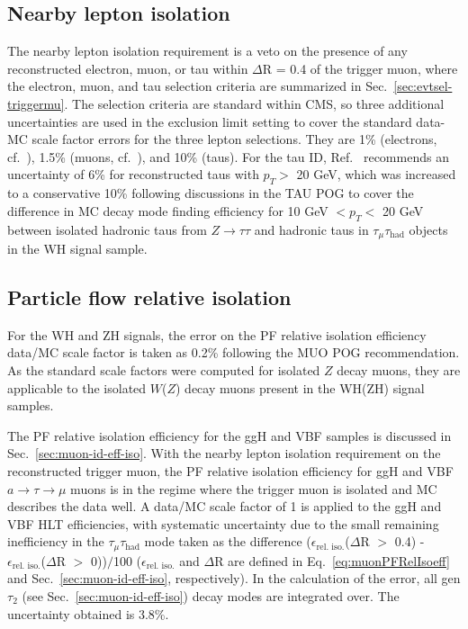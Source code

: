 \subsection{Nearby lepton isolation\label{lepideff-leptonveto}}

The nearby lepton isolation requirement is a veto on the presence of any reconstructed electron, muon, or tau within $\Delta$R = 0.4 of the trigger muon, where the electron, muon, and tau selection criteria are summarized in Sec.~\ref{sec:evtsel-triggermu}.  The selection criteria are standard within CMS, so three additional uncertainties are used in the exclusion limit setting to cover the standard data-MC scale factor errors for the three lepton selections.  They are 1\% (electrons, cf.~\cite{CMS:egammauncertaintytwiki}), 1.5\% (muons, cf.~\cite{CMS:muonuncertaintytwiki}), and 10\% (taus).  For the tau ID, Ref.~\cite{CMS:tauuncertaintytwiki} recommends an uncertainty of 6\% for reconstructed taus with $p_T >$ 20 GeV, which was increased to a conservative 10\% following discussions in the TAU POG to cover the difference in MC decay mode finding efficiency for 10 GeV $< p_T <$ 20 GeV between isolated hadronic taus from $Z\rightarrow\tau\tau$ and hadronic taus in $\tau_{\mu}\tau_{\text{had}}$ objects in the WH signal sample.

\subsection{Particle flow relative isolation\label{lepideff-iso}}

For the WH and ZH signals, the error on the PF relative isolation efficiency data/MC scale factor is taken as 0.2\% following the MUO POG recommendation.  As the standard scale factors were computed for isolated $Z$ decay muons, they are applicable to the isolated $W$($Z$) decay muons present in the WH(ZH) signal samples.

The PF relative isolation efficiency for the ggH and VBF samples is discussed in Sec.~\ref{sec:muon-id-eff-iso}. With the nearby lepton isolation requirement on the reconstructed trigger muon, the PF relative isolation efficiency for ggH and VBF $a\rightarrow\tau\rightarrow\mu$ muons is in the regime where the trigger muon is isolated and MC describes the data well.  A data/MC scale factor of 1 is applied to the ggH and VBF HLT efficiencies, with systematic uncertainty due to the small remaining inefficiency in the $\tau_{\mu}\tau_{\text{had}}$ mode taken as the difference ($\epsilon_{\text{rel. iso.}}$($\Delta$R $>$ 0.4) - $\epsilon_{\text{rel. iso.}}$($\Delta$R $>$ 0))$/$100 ($\epsilon_{\text{rel. iso.}}$ and $\Delta$R are defined in Eq.~\ref{eq:muonPFRelIsoeff} and Sec.~\ref{sec:muon-id-eff-iso}, respectively).  In the calculation of the error, all gen $\tau_{\text{2}}$ (see Sec.~\ref{sec:muon-id-eff-iso}) decay modes are integrated over.  The uncertainty obtained is 3.8\%.

